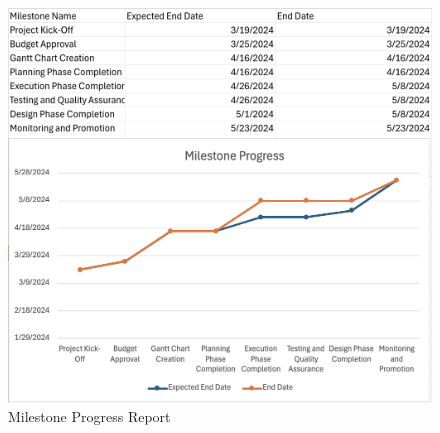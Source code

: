 \begin{figure}[ht]
    \includegraphics[width=\textwidth]{images/milestone-report.png}
    \caption{Milestone Progress Report}
    \label{fig:milestone_report}
\end{figure}


\FloatBarrier
\newpage